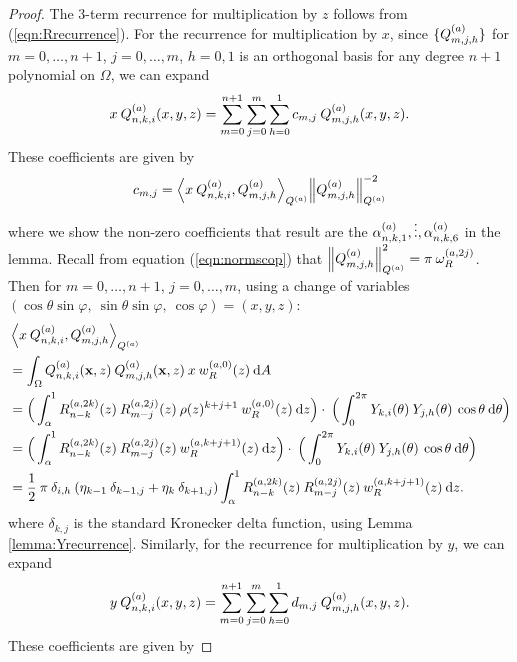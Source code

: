 \documentclass[11pt, oneside]{article}   	%
\begin{document}
\begin{proof}
	The 3-term recurrence for multiplication by $z$ follows from (\ref{eqn:Rrecurrence}). For the recurrence for multiplication by $x$, since $\{Q_{m,j,h}^{(a)}\}$ for $m = 0,\dots,n+1$, $j = 0,\dots,m$, $h = 0,1$ is an orthogonal basis for any degree $n+1$ polynomial on $\Omega$, we can expand 
\begin{align*}
	x \: Q_{n,k,i}^{(a)}(x,y,z) = \sum_{m=0}^{n+1} \sum_{j=0}^m \sum_{h=0}^1 c_{m,j} \: Q_{m,j,h}^{(a)}(x,y,z).
\end{align*}
These coefficients are given by
\begin{align*}
	c_{m,j} = {\ip< x \: \scopnkia, \scopmjha >_{\scopa}}{\norm{\scopmjha}^{-2}_{\scopa}}
\end{align*}
where we show the non-zero coefficients that result are the $\alpha^{(a)}_{n,k,1},\vdots,\alpha^{(a)}_{n,k,6}$ in the lemma.
Recall from equation (\ref{eqn:normscop}) that $\left\| Q_{m,j,h}^{(a)} \right\|_{Q^{(a)}}^2 = \pi \: \omega_R^{(a,2j)}$. Then for $m = 0,\dots,n+1$, $j = 0,\dots,m$, using a change of variables $(\cos\theta \sin\varphi, \: \sin\theta\sin\varphi, \: \cos\varphi) = (x, y, z)$:
\begin{align*}
	&\ip<x \: \scopnkia, \scopmjha>_{\scopa} \\
	&= \int_\Omega \scopnkia(\xvec,z) \: \scopmjha(\xvec,z) \: x \: \genjacw^{(a,0)}(z) \: \D A \\
	&= \Big( \int^1_\alpha \genjacnmk^{(a, 2k)}(z) \: \genjacmmj^{(a, 2j)}(z) \: \rho(z)^{k+j+1} \: \genjacw^{(a, 0)}(z) \: \D z \Big) \cdot \: \Big( \int_0^{2\pi} \chki(\theta) \: \chjh(\theta) \: \cos\theta \: \D \theta \Big) \\
	&= \Big( \int^1_\alpha \genjacnmk^{(a, 2k)}(z) \: \genjacmmj^{(a, 2j)}(z) \: \genjacw^{(a, k + j + 1)}(z) \: \D z \Big) \cdot \: \Big( \int_0^{2\pi} \chki(\theta) \: \chjh(\theta) \: \cos\theta \: \D \theta \Big) \\
	&= \half \: \pi \: \delta_{i,h} \: (\eta_{k-1} \: \delta_{k-1, j} + \eta_{k} \: \delta_{k+1, j})  \int^1_\alpha \genjacnmk^{(a, 2k)}(z) \: \genjacmmj^{(a, 2j)}(z) \: \genjacw^{(a, k + j + 1)}(z) \: \D z.
\end{align*}
where $\delta_{k, j}$ is the standard Kronecker delta function, using Lemma \ref{lemma:Yrecurrence}. Similarly, for the recurrence for multiplication by $y$, we can expand 
\begin{align*}
	y \: Q_{n,k,i}^{(a)}(x,y,z) = \sum_{m=0}^{n+1} \sum_{j=0}^m \sum_{h=0}^1 d_{m,j} \: Q_{m,j,h}^{(a)}(x,y,z).
\end{align*}
These coefficients are given by

\end{proof}
\end{document}
